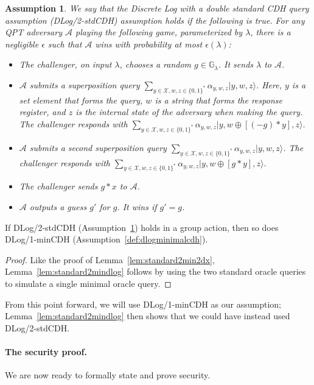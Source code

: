 \documentclass{article}\usepackage[a4paper,margin=20mm]{geometry}
\newtheorem{assumption}[theorem]{Assumption}
\numberwithin{theorem}{section}
\numberwithin{equation}{section}
\newcommand{\G}{\mathbb{G}}
\newcommand{\As}{{\mathcal{A}}}
\newcommand{\Xs}{{\mathcal{X}}}
\begin{document}
\begin{assumption}\label{def:dlogstandardcdh} We say that the \emph{Discrete Log with a double standard CDH query} assumption (DLog/2-stdCDH) assumption holds if the following is true. For any QPT adversary $\As$ playing the following game, parameterized by $\lambda$, there is a negligible $\epsilon$ such that $\As$ wins with probability at most $\epsilon(\lambda)$:
	\begin{itemize}
		\item The challenger, on input $\lambda$, chooses a random $g\in\G_\lambda$. It sends $\lambda$ to $\As$.
		\item $\As$ submits a superposition query $\sum_{y\in\Xs,w,z\in\{0,1\}^*}\alpha_{y,w,z}|y,w,z\rangle$. Here, $y$ is a set element that forms the query, $w$ is a string that forms the response register, and $z$ is the internal state of the adversary when making the query. The challenger responds with $\sum_{y\in\Xs,w,z\in\{0,1\}^*}\alpha_{y,w,z}|y,w\oplus[(-g)*y],z\rangle$. 
		\item $\As$ submits a second superposition query $\sum_{y\in\Xs,w,z\in\{0,1\}^*}\alpha_{y,w,z}|y,w,z\rangle$. The challenger responds with $\sum_{y\in\Xs,w,z\in\{0,1\}^*}\alpha_{y,w,z}|y,w\oplus[g*y],z\rangle$. 
		\item The challenger sends $g*x$ to $\As$.
		\item $\As$ outputs a guess $g'$ for $g$. It wins if $g'=g$.
	\end{itemize}
\end{assumption}

\begin{lemma}\label{lem:standard2mindlog} If DLog/2-stdCDH (Assumption~\ref{def:dlogstandardcdh}) holds in a group action, then so does DLog/1-minCDH (Assumption~\ref{def:dlogminimalcdh}).
\end{lemma}
\begin{proof}Like the proof of Lemma~\ref{lem:standard2min2dx}, Lemma~\ref{lem:standard2mindlog} follows by using the two standard oracle queries to simulate a single minimal oracle query.\end{proof}

From this point forward, we will use DLog/1-minCDH as our assumption; Lemma~\ref{lem:standard2mindlog} then shows that we could have instead used DLog/2-stdCDH.

\paragraph{The security proof.} We are now ready to formally state and prove security.
\end{document}
